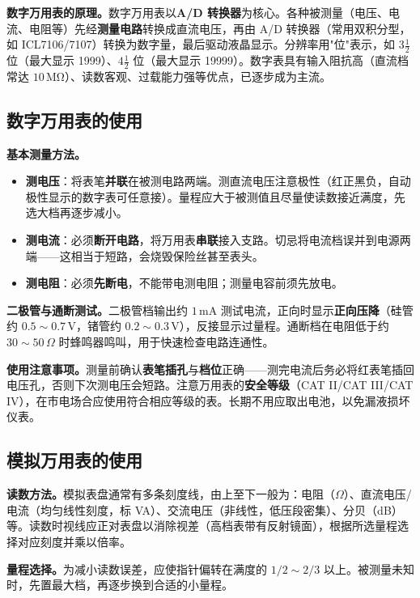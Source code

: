 \documentclass[12pt,UTF8]{ctexbook}
\begin{document}
\textbf{数字万用表的原理。}数字万用表以\textbf{A/D 转换器}为核心。各种被测量（电压、电流、电阻等）先经\textbf{测量电路}转换成直流电压，再由 A/D 转换器（常用双积分型，如 ICL7106/7107）转换为数字量，最后驱动液晶显示。分辨率用"位"表示，如 $3\frac{1}{2}$ 位（最大显示 1999）、$4\frac{1}{2}$ 位（最大显示 19999）。数字表具有输入阻抗高（直流档常达 $10\,\mathrm{M\Omega}$）、读数客观、过载能力强等优点，已逐步成为主流。

\subsection{数字万用表的使用}

\textbf{基本测量方法。}
\begin{itemize}
  \item \textbf{测电压}：将表笔\textbf{并联}在被测电路两端。测直流电压注意极性（红正黑负，自动极性显示的数字表可任意接）。量程应大于被测值且尽量使读数接近满度，先选大档再逐步减小。
  \item \textbf{测电流}：必须\textbf{断开电路}，将万用表\textbf{串联}接入支路。切忌将电流档误并到电源两端——这相当于短路，会烧毁保险丝甚至表头。
  \item \textbf{测电阻}：必须\textbf{先断电}，不能带电测电阻；测量电容前须先放电。
\end{itemize}

\textbf{二极管与通断测试。}二极管档输出约 $1\,\mathrm{mA}$ 测试电流，正向时显示\textbf{正向压降}（硅管约 $0.5\sim 0.7\,\mathrm{V}$，锗管约 $0.2\sim 0.3\,\mathrm{V}$），反接显示过量程。通断档在电阻低于约 $30\sim 50\,\Omega$ 时蜂鸣器鸣叫，用于快速检查电路连通性。

\textbf{使用注意事项。}测量前确认\textbf{表笔插孔}与\textbf{档位}正确——测完电流后务必将红表笔插回电压孔，否则下次测电压会短路。注意万用表的\textbf{安全等级}（CAT II/CAT III/CAT IV），在市电场合应使用符合相应等级的表。长期不用应取出电池，以免漏液损坏仪表。

\subsection{模拟万用表的使用}

\textbf{读数方法。}模拟表盘通常有多条刻度线，由上至下一般为：电阻（$\Omega$）、直流电压/电流（均匀线性刻度，标 VA）、交流电压（非线性，低压段密集）、分贝（dB）等。读数时视线应正对表盘以消除视差（高档表带有反射镜面），根据所选量程选择对应刻度并乘以倍率。

\textbf{量程选择。}为减小读数误差，应使指针偏转在满度的 $1/2\sim 2/3$ 以上。被测量未知时，先置最大档，再逐步换到合适的小量程。
\end{document}
